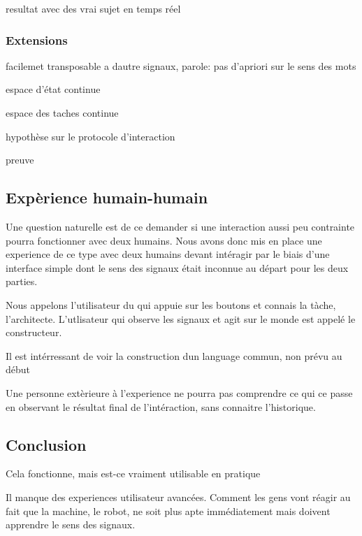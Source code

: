 resultat avec des vrai sujet en temps réel

\subsubsection*{Extensions}

facilemet transposable a dautre signaux, parole: pas d'apriori sur le sens des mots

espace d'état continue

espace des taches continue

hypothèse sur le protocole d'interaction

preuve

\subsection*{Expèrience humain-humain}

Une question naturelle est de ce demander si une interaction aussi peu contrainte pourra fonctionner avec deux humains. Nous avons donc mis en place une experience de ce type avec deux humains devant intéragir par le biais d'une interface simple dont le sens des signaux était inconnue au départ pour les deux parties. 

Nous appelons l'utilisateur du qui appuie sur les boutons et connais la tàche, l'architecte. L'utlisateur qui observe les signaux et agit sur le monde est appelé le constructeur.

Il est intérressant de voir la construction dun language commun, non prévu au début

Une personne extèrieure à l'experience ne pourra pas comprendre ce qui ce passe en observant le résultat final de l'intéraction, sans connaitre l'historique.

\subsection*{Conclusion}

Cela fonctionne, mais est-ce vraiment utilisable en pratique

Il manque des experiences utilisateur avancées.
Comment les gens vont réagir au fait que la machine, le robot, ne soit plus apte immédiatement mais doivent apprendre le sens des signaux.
